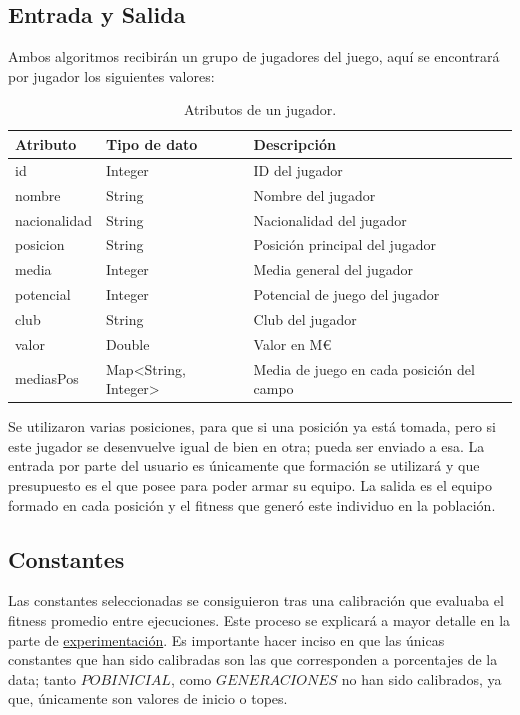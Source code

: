 \documentclass{article}
\begin{document}
\subsection{Entrada y Salida}
Ambos algoritmos recibirán un grupo de jugadores del juego, aquí se encontrará por jugador los siguientes valores:

\begin{table}[H]
    \centering
    \begin{tabularx}{\columnwidth}{|X|X|X|}
        \hline
        Atributo & Tipo de dato & Descripción \\
        \hline
        id & Integer & ID del jugador\\
        nombre & String & Nombre del jugador \\
        nacionalidad & String & Nacionalidad del jugador\\
        posicion & String & Posición principal del jugador\\
        media & Integer & Media general del jugador\\
        potencial & Integer & Potencial de juego del jugador\\
        club & String & Club del jugador\\
        valor & Double & Valor en M€\\
        mediasPos & Map<String, Integer> & Media de juego en cada posición del campo\\
        
        \hline
    \end{tabularx}
    \caption{Atributos de un jugador.}
    \label{tab:etiqueta}
\end{table}

Se utilizaron varias posiciones, para que si una posición ya está tomada, pero si este jugador se desenvuelve igual de bien en otra; pueda ser enviado a esa.\newline
La entrada por parte del usuario es únicamente que formación se utilizará y que presupuesto es el que posee para poder armar su equipo.\newline
La salida es el equipo formado en cada posición y el fitness que generó este individuo en la población.

\subsection{Constantes}
Las constantes seleccionadas se consiguieron tras una calibración que evaluaba el fitness promedio entre ejecuciones. Este proceso se explicará a mayor detalle en la parte de \hyperref[sec:exp]{experimentación}. Es importante hacer inciso en que las únicas constantes que han sido calibradas son las que corresponden a porcentajes de la data; tanto $POBINICIAL$, como $GENERACIONES$ no han sido calibrados, ya que, únicamente son valores de inicio o topes.
\end{document}
